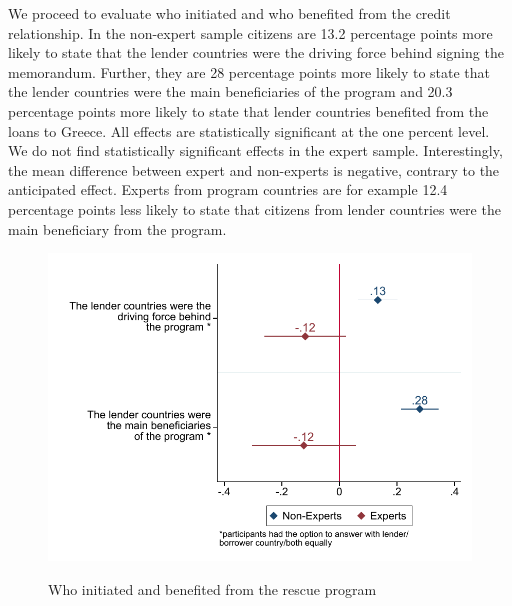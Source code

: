  We proceed to evaluate who initiated and who benefited from the credit relationship. 
In the non-expert sample citizens are 13.2 percentage points more likely to state that the lender countries were the driving force behind signing the memorandum. Further, they are 28 percentage points more likely to state that the lender countries were the main beneficiaries of the program and 20.3 percentage points more likely to state that lender countries benefited from the loans to Greece. All effects are statistically significant at the one percent level. We do not find statistically significant effects in the expert sample. Interestingly, the mean difference between expert and non-experts is negative, contrary to the anticipated effect. Experts from program countries are for example 12.4 percentage points less likely to state that citizens from lender countries were the main beneficiary from the program.\\
\begin{figure}[h!] 
\begin{center}
     \caption{Who initiated and benefited from the rescue program}
     \includegraphics[scale=0.8]{Question3_4_base.pdf}
     \label{fig:my_label}
     \end{center}
     \tiny
\end{figure}

